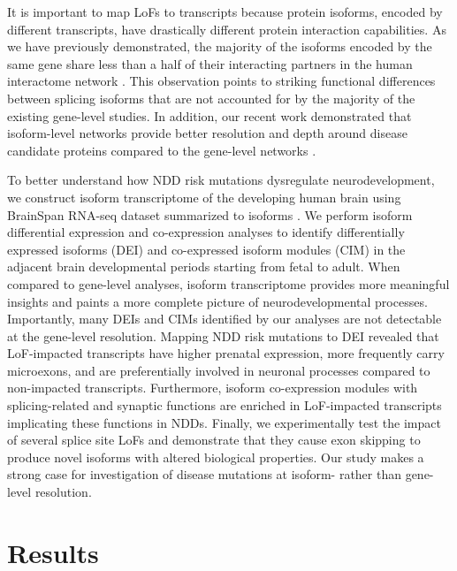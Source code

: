 \documentclass[12pt,chapterheads,final]{ucsd}
\begin{document}
It is important to map LoFs to transcripts because protein isoforms, encoded by different transcripts, have drastically different protein interaction capabilities. As we have previously demonstrated, the majority of the isoforms encoded by the same gene share less than a half of their interacting partners in the human interactome network \cite{Yang2016}. This observation points to striking functional differences between splicing isoforms that are not accounted for by the majority of the existing gene-level studies. In addition, our recent work demonstrated that isoform-level networks provide better resolution and depth around disease candidate proteins compared to the gene-level networks \cite{Corominas2014}. \par
To better understand how NDD risk mutations dysregulate neurodevelopment, we construct isoform transcriptome of the developing human brain using BrainSpan RNA-seq dataset \cite{Kang2011} summarized to isoforms \cite{Gandal2018}. We perform isoform differential expression and co-expression analyses to identify differentially expressed isoforms (DEI) and co-expressed isoform modules (CIM) in the adjacent brain developmental periods starting from fetal to adult. When compared to gene-level analyses, isoform transcriptome provides more meaningful insights and paints a more complete picture of neurodevelopmental processes. Importantly, many DEIs and CIMs identified by our analyses are not detectable at the gene-level resolution. Mapping NDD risk mutations to DEI revealed that LoF-impacted transcripts have higher prenatal expression, more frequently carry microexons, and are preferentially involved in neuronal processes compared to non-impacted transcripts. Furthermore, isoform co-expression modules with splicing-related and synaptic functions are enriched in LoF-impacted transcripts implicating these functions in NDDs. Finally, we experimentally test the impact of several splice site LoFs and demonstrate that they cause exon skipping to produce novel isoforms with altered biological properties. Our study makes a strong case for investigation of disease mutations at isoform- rather than gene-level resolution.\par

\chapter{Results}
\end{document}
